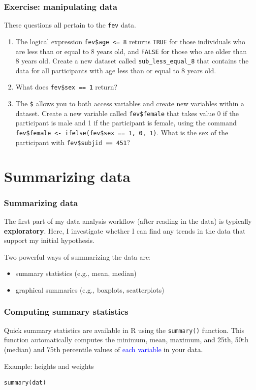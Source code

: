 \documentclass[11pt,dvipsnames]{beamer}
\begin{document}
\begin{frame}
\frametitle{Exercise: manipulating data}
These questions all pertain to the \texttt{fev} data. 

\begin{enumerate}
\item The logical expression \texttt{fev\$age <= 8} returns \texttt{TRUE} for those individuals who are less than or equal to 8 years old, and \texttt{FALSE} for those who are older than 8 years old. Create a new dataset called \texttt{sub\_less\_equal\_8} that contains the data for all participants with age less than or equal to 8 years old.
\item What does \texttt{fev\$sex == 1} return?
\item The \texttt{\$} allows you to both access variables and create new variables within a dataset. Create a new variable called \texttt{fev\$female} that takes value 0 if the participant is male and 1 if the participant is female, using the command \texttt{fev\$female <- ifelse(fev\$sex == 1, 0, 1)}. What is the sex of the participant with \texttt{fev\$subjid == 451}?
\end{enumerate}
\end{frame}

\section{Summarizing data}
\begin{frame}
\frametitle{Summarizing data}
The first part of my data analysis workflow (after reading in the data) is typically \textbf{exploratory}. Here, I investigate whether I can find any trends in the data that support my initial hypothesis.

Two powerful ways of summarizing the data are:
\begin{itemize}
\item summary statistics (e.g., mean, median)
\item graphical summaries (e.g., boxplots, scatterplots)
\end{itemize}
\end{frame}


\begin{frame}[fragile]
\frametitle{Computing summary statistics}
Quick summary statistics are available in R using the \texttt{summary()} function. This function automatically computes the minimum, mean, maximum, and 25th, 50th (median) and 75th percentile values of \textcolor{blue}{each variable} in your data.

Example: heights and weights
\begin{verbatim}
summary(dat)
\end{verbatim}
\end{frame}
\end{document}
